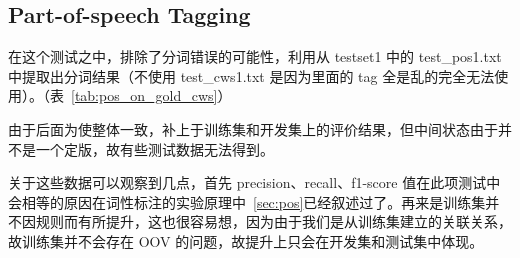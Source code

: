 \subsection*{Part-of-speech Tagging}


在这个测试之中，排除了分词错误的可能性，利用从 testset1 中的 test\_pos1.txt 中提取出分词结果（不使用 test\_cws1.txt 是因为里面的 tag 全是乱的完全无法使用）。（表~\ref{tab:pos_on_gold_cws}）

由于后面为使整体一致，补上于训练集和开发集上的评价结果，但中间状态由于并不是一个定版，故有些测试数据无法得到。

关于这些数据可以观察到几点，首先 precision、recall、f1-score 值在此项测试中会相等的原因在词性标注的实验原理中~\ref{sec:pos}已经叙述过了。再来是训练集并不因规则而有所提升，这也很容易想，因为由于我们是从训练集建立的关联关系，故训练集并不会存在 OOV 的问题，故提升上只会在开发集和测试集中体现。





% 
